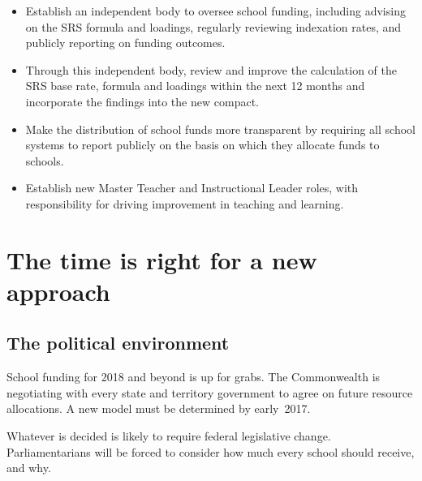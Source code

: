 \documentclass{grattan}
\begin{document}
\oneraggedpage \pagebreak
{}\label{rec:recommendation-2-strengthen-governance-of-school-funding}

\begin{itemize}
    \item Establish an independent body to oversee school funding, including advising on the SRS formula and loadings, regularly reviewing indexation rates, and publicly reporting on funding outcomes.
    \item Through this independent body, review and improve the calculation of the SRS base rate, formula and loadings within the next 12 months and incorporate the findings into the new compact.
    \item Make the distribution of school funds more transparent by requiring all school systems to report publicly on the basis on which they allocate funds to schools.
\end{itemize}

\label{rec:recommendation-3-re-direct-the-savings-to-invest-in-highly-skilled-teachers-to-lift-the-effectiveness-of-the-workforce}
\begin{itemize}
    \item Establish new Master Teacher and Instructional Leader roles, with responsibility for driving improvement in teaching and learning.
\end{itemize}



\contentspage
\listoffigures

\chapter{The time is right for a new approach }\label{chap:the-time-is-right-for-a-new-approach}

\section{The political environment}\label{sec:the-political-environment}
School funding for 2018 and beyond is up for grabs.
The Commonwealth is negotiating with every state and territory government to agree on future resource allocations.
A new model must be determined by early~2017.

Whatever is decided is likely to require federal legislative change.
Parliamentarians will be forced to consider how much every school should receive, and why.
\end{document}

